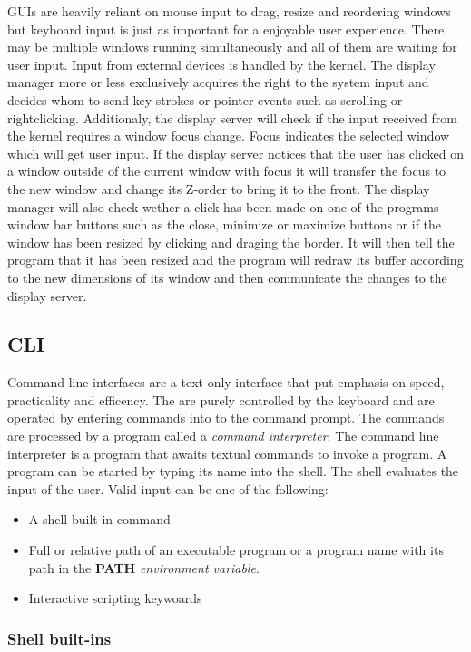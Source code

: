 GUIs are heavily reliant on mouse input to drag, resize and reordering windows but keyboard input
is just as important for a enjoyable user experience. There may be multiple windows running
simultaneously and all of them are waiting for user input. Input from external devices is handled by the
kernel. The display manager more or less exclusively acquires the right to the system input
and decides whom to send key strokes or pointer events such as scrolling or rightclicking. Additionaly,
the display server will check if the input received from the kernel requires a window focus change.
Focus indicates the selected window which will get user input. If the display server notices that
the user has clicked on a window outside of the current window with focus it will transfer the focus
to the new window and change its Z-order to bring it to the front.
The display manager will also check wether a click has been made on one of the programs window bar
buttons such as the close, minimize or maximize buttons or if the window has been resized by clicking
and draging the border. It will then tell the program that it has been resized and the program will
redraw its buffer according to the new dimensions of its window and then communicate the changes to the
display server.

\subsection{CLI}

Command line interfaces are a text-only interface that put emphasis on speed, practicality and
efficency. The are purely controlled by the keyboard and are operated by entering
commands into to the command prompt. The commands are processed by a program called a \textit{command
interpreter}. The command line interpreter is a program that awaits
textual commands to invoke a program. A program can be started by typing its name into the shell. The
shell evaluates the input of the user. Valid input can be one of the following:
\begin{itemize}
	\item A shell built-in command
	\item Full or relative path of an executable program or a program name with its path in the \textbf{PATH} \textit{environment variable}.
\item Interactive scripting keywoards 
\end{itemize}

\subsubsection{Shell built-ins}

